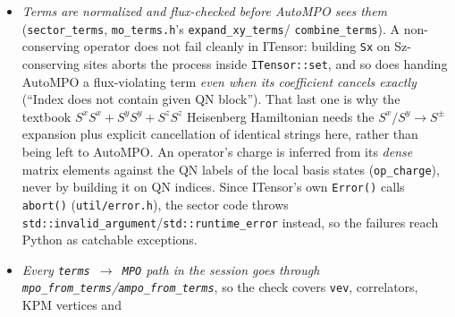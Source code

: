\documentclass[11pt]{article}
\begin{document}
\begin{itemize}
\begin{itemize}
        \texttt{randomMPS(SiteSet)} refuses to guess a sector under QNs
        and \texttt{randomMPS(InitState,m>1)} does not exist in this
        vendored copy (both hard \texttt{Error}s in \texttt{mps.cc}).
        The per-site assignment comes from a small dynamic program over
        reachable partial charges (\texttt{sector\_state\_plan}), exact
        rather than greedy because a Hubbard chain at fixed \texttt{Nf}
        \emph{and} \texttt{Sz} dead-ends a greedy fill; arrangements are
        then shuffled within each site-type code, which is charge-neutral
        by construction. The old \texttt{default\_mps()} comment about
        DMRG being ``stuck at the product energy no matter how large a
        noise term'' is about the \emph{all-first-basis-state} start it
        was measured with --- that state is the unique state of its own
        sector, so nothing can move it. An in-sector start converges to
        the identical energy as the dense path ($-5.142090632836$ on a
        12-site Heisenberg chain, twelve digits, from either a N\'eel or
        a sum-of-products start).
      \item \emph{Terms are normalized and flux-checked before AutoMPO
        sees them} (\texttt{sector\_terms},
        \texttt{mo\_terms.h}'s \texttt{expand\_xy\_terms}/%
        \texttt{combine\_terms}). A non-conserving operator does not fail
        cleanly in ITensor: building \texttt{Sx} on Sz-conserving sites
        aborts the process inside \texttt{ITensor::set}, and so does
        handing AutoMPO a flux-violating term \emph{even when its
        coefficient cancels exactly} (``Index does not contain given QN
        block''). That last one is why the textbook
        $S^xS^x+S^yS^y+S^zS^z$ Heisenberg Hamiltonian needs the
        $S^x/S^y\to S^\pm$ expansion plus explicit cancellation of
        identical strings here, rather than being left to AutoMPO. An
        operator's charge is inferred from its \emph{dense} matrix
        elements against the QN labels of the local basis states
        (\texttt{op\_charge}), never by building it on QN indices. Since
        ITensor's own \texttt{Error()} calls \texttt{abort()}
        (\texttt{util/error.h}), the sector code throws
        \texttt{std::invalid\_argument}/\texttt{std::runtime\_error}
        instead, so the failures reach Python as catchable exceptions.
      \item \emph{Every \texttt{terms $\to$ MPO} path in the session goes
        through \texttt{mpo\_from\_terms}/\texttt{ampo\_from\_terms}}, so
        the check covers \texttt{vev}, correlators, KPM vertices and

\end{itemize}
\end{itemize}
\end{document}
